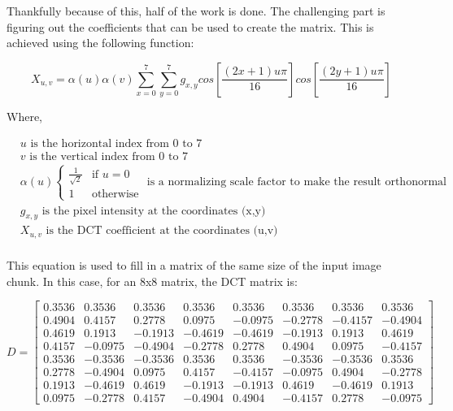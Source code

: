 \documentclass[11pt]{article}
\begin{document}
Thankfully because of this, half of the work is done.
The challenging part is figuring out the coefficients that can be used to create the matrix.
This is achieved using the following function:

\begin{equation}
  \label{eqn:dct}
  X_{u,v} = \alpha(u) \alpha(v) \sum_{x=0}^{7} \sum_{y=0}^{7} g_{x,y} cos \left [  \frac{(2x+1)u\pi}{16} \right ] cos \left [  \frac{(2y+1)u\pi}{16} \right ]
\end{equation}

Where,

\begin{align*}
  &u \text{ is the horizontal index from 0 to 7} \\
  &v \text{ is the vertical index from 0 to 7} \\
  &\alpha(u) \left\{\begin{matrix}
    \frac{1}{\sqrt{2}} & \text{if } u=0 \\ 
    1 &  \text{otherwise}
  \end{matrix}\right. \text{ is a normalizing scale factor to make the result orthonormal} \\
  &g_{x,y} \text{ is the pixel intensity at the coordinates (x,y)} \\
  &X_{u,v} \text{ is the DCT coefficient at the coordinates (u,v)} \\
\end{align*}

This equation is used to fill in a matrix of the same size of the input image chunk.
In this case, for an 8x8 matrix, the DCT matrix is:

\begin{equation}
  \label{eqn:dctMatrix}
  D = \begin{bmatrix}
    0.3536 & 0.3536 & 0.3536 & 0.3536 & 0.3536 & 0.3536 & 0.3536 & 0.3536 \\
    0.4904 & 0.4157 & 0.2778 & 0.0975 &-0.0975 &-0.2778 &-0.4157 &-0.4904 \\
    0.4619 & 0.1913 &-0.1913 &-0.4619 &-0.4619 &-0.1913 & 0.1913 & 0.4619 \\
    0.4157 &-0.0975 &-0.4904 &-0.2778 & 0.2778 & 0.4904 & 0.0975 &-0.4157 \\
    0.3536 &-0.3536 &-0.3536 & 0.3536 & 0.3536 &-0.3536 &-0.3536 & 0.3536 \\
    0.2778 &-0.4904 & 0.0975 & 0.4157 &-0.4157 &-0.0975 & 0.4904 &-0.2778 \\
    0.1913 &-0.4619 & 0.4619 &-0.1913 &-0.1913 & 0.4619 &-0.4619 & 0.1913 \\
    0.0975 &-0.2778 & 0.4157 &-0.4904 & 0.4904 &-0.4157 & 0.2778 &-0.0975
  \end{bmatrix}
\end{equation}
\end{document}
